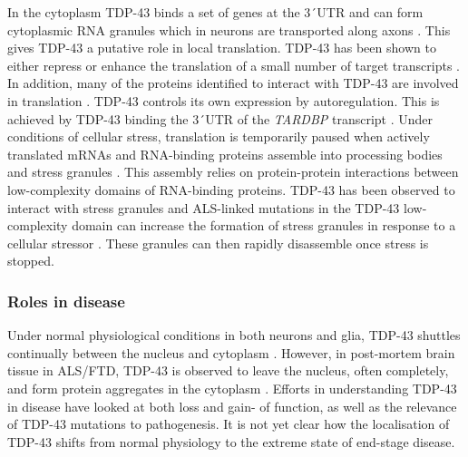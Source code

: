 In the cytoplasm TDP-43 binds a set of genes at the 3\'\ UTR \citep{Colombrita2012} and can form cytoplasmic RNA granules which in neurons are transported along axons \citep{Alami2013, Fallini2012}. 
This gives TDP-43 a putative role in local translation.
TDP-43 has been shown to either repress or enhance the translation of a small number of target transcripts \citep{Majumder2012, Majumder2016, Neelagandan2018}.
In addition, many of the proteins identified to interact with TDP-43 are involved in translation \citep{Freibaum2010-hw}.
TDP-43 controls its own expression by autoregulation.
This is achieved by TDP-43 binding the 3\'\ UTR of the \textit{TARDBP} transcript \citep{Ayala2011,Koyama2016}. 
Under conditions of cellular stress, translation is temporarily paused when actively translated mRNAs and RNA-binding proteins assemble into processing bodies and stress granules \citep{Anderson2008}. 
This assembly relies on protein-protein interactions between low-complexity domains of RNA-binding proteins.
TDP-43 has been observed to interact with stress granules \citep{Colombrita2009} and ALS-linked mutations in the TDP-43 low-complexity domain can increase the formation of stress granules in response to a cellular stressor \citep{Liu-Yesucevitz2010}.
These granules can then rapidly disassemble once stress is stopped.


\subsubsection{Roles in disease}

Under normal physiological conditions in both neurons and glia, TDP-43 shuttles continually between the nucleus and cytoplasm \citep{Ayala2008}.
However, in post-mortem brain tissue in ALS/FTD, TDP-43 is observed to leave the nucleus, often completely, and form protein aggregates in the cytoplasm \citep{Neumann2006}.
Efforts in understanding TDP-43 in disease have looked at both loss and gain- of function, as well as the relevance of TDP-43 mutations to pathogenesis.
It is not yet clear how the localisation of TDP-43 shifts from normal physiology to the extreme state of end-stage disease.


